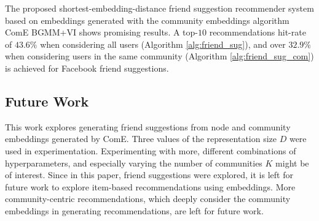 \documentclass[conference]{IEEEtran}
\begin{document}
The proposed shortest-embedding-distance friend suggestion recommender system based on embeddings generated with the community embeddings algorithm ComE BGMM+VI shows promising results.
A top-$10$ recommendations hit-rate of $43.6\%$ when considering all users (Algorithm \ref{alg:friend_sug}), and over $32.9\%$ when considering users in the same community (Algorithm \ref{alg:friend_sug_com}) is achieved for Facebook friend suggestions.

\subsection{Future Work}

This work explores generating friend suggestions from node and community embeddings generated by ComE. Three values of the representation size $D$ were used in experimentation. Experimenting with more, different combinations of hyperparameters, and especially varying the number of communities $K$ might be of interest. Since in this paper, friend suggestions were explored, it is left for future work to explore item-based recommendations using embeddings. More community-centric recommendations, which deeply consider the community embeddings in generating recommendations, are left for future work.




\end{document}
